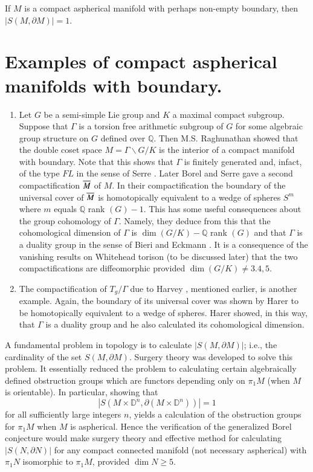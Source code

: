 If $M$ is a compact aspherical manifold with perhaps non-empty
boundary, then $|S (M, \partial M)|=1$.

\section{Examples of compact aspherical manifolds with
  boundary.}\label{c2:sec2.4} 

\begin{enumerate}[(1)]
\item Let $G$ be a semi-simple Lie group and $K$ a maximal compact
  subgroup. Suppose that $\Gamma$ is a torsion free arithmetic
  subgroup of $G$ for some algebraic group structure on $G$ defined
  over $\mathbb{Q}$. Then M.S. Raghunathan \cite{85} showed that the
  double coset space $M= \Gamma\backslash G/K$ is the interior of a
  compact manifold with boundary. Note that this shows that $\Gamma$
  is finitely generated and, infact, of the type $FL$ in the sense of
  Serre \cite{88}. Later Borel and Serre \cite{10} gave a second
  compactification $\overline{M}$ of $M$. In their compactification the\pageoriginale
  boundary of the universal cover of $\overline{M}$ is homotopically
  equivalent to a wedge of spheres $S^{m}$ where $m$ equals
  $\mathbb{Q}$ rank $(G)-1$. This has some useful consequences about
  the group cohomology of $\Gamma$. Namely, they deduce from this that
  the cohomological dimension of $\Gamma$ is $\dim (G/K)-\mathbb{Q}$
  rank $(G)$ and that $\Gamma$ is a duality group in the sense of
  Bieri and Eckmann \cite{7}. It is a consequence of the vanishing
  results on Whitehead torison (to be discussed later) that the two
  compactifications are diffeomorphic provided $\dim (G/K) \neq 3. 4,
  5$.
\item The compactification of $T_g/\Gamma$ due to Harvey \cite{56},
  mentioned earlier, is another example. Again, the boundary of its
  universal cover was shown by Harer \cite{55} to be homotopically
  equivalent to a wedge of spheres. Harer showed, in this way, that
  $\Gamma$ is a duality group and he also calculated its cohomological
  dimension. 
\end{enumerate}

A fundamental problem in topology is to calculate $|S(M, \partial
M)|$; i.e., the cardinality of the set $S(M, \partial M)$. Surgery
theory was developed to solve this problem. It essentially reduced the
problem to calculating certain algebraically defined obstruction
groups which are functors depending only on $\pi_1 M$ (when $M$ is
orientable). In particular, showing that
$$
|S (M \times \mathbb{D}^n, \partial (M \times \mathbb{D}^n))|=1
$$
for all sufficiently large integers $n$, yields a calculation of the
obstruction groups for $\pi_1 M$ when $M$ is aspherical. Hence the
verification of the generalized Borel conjecture would make surgery
theory and effective method for calculating $|S (N, \partial N)|$ for
any compact connected manifold (not necessary aspherical) with $\pi_1
N$ isomorphic to $\pi_1 M$, provided $\dim N \geq 5$.

